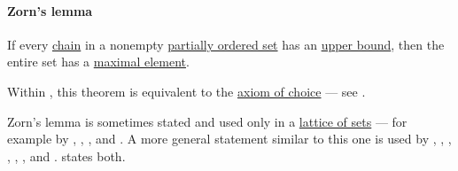 \paragraph{Zorn's lemma}

\begin{lemma}\label{thm:zorns_lemma}
  If every \hyperref[def:partial_order_chain]{chain} in a nonempty \hyperref[def:partially_ordered_set]{partially ordered set} has an \hyperref[def:extremal_points/bounds]{upper bound}, then the entire set has a \hyperref[def:extremal_points/maximal_and_minimal_element]{maximal element}.
\end{lemma}
\begin{comments}
  \item Within \hyperref[def:zfc]{}, this theorem is equivalent to the \hyperref[def:zfc/choice]{axiom of choice} --- see .

  \item Zorn's lemma is sometimes stated and used only in a \hyperref[thm:boolean_algebra_of_subsets]{lattice of sets} --- for example by , , ,  and . A more general statement similar to this one is used by , , , , , ,  and .  states both.
\end{comments}
